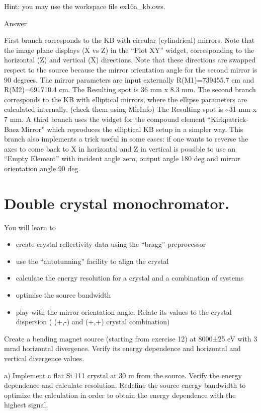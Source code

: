 \documentclass[]{article}
\providecommand{\tightlist}{%
  \setlength{\itemsep}{0pt}\setlength{\parskip}{0pt}}
\begin{document}
Hint: you may use the workspace file ex16a\_kb.ows.

Answer

First branch corresponds to the KB with circular (cylindrical) mirrors.
Note that the image plane displays (X vs Z) in the ``Plot XY'' widget,
corresponding to the horizontal (Z) and vertical (X) directions. Note
that these directions are swapped respect to the source because the
mirror orientation angle for the second mirror is 90 degrees. The mirror
parameters are input externally R(M1)=739455.7 cm and R(M2)=691710.4 cm.
The Resulting spot is 36 mm x 8.3 mm. The second branch corresponds to
the KB with elliptical mirrors, where the ellipse parameters are
calculated internally. (check them using MirInfo) The Resulting spot is
\textasciitilde{}31 mm x 7 mm. A third branch uses the widget for the
compound element ``Kirkpatrick-Baez Mirror'' which reproduces the
elliptical KB setup in a simpler way. This branch also implements a
trick useful in some cases: if one wants to reverse the axes to come
back to X in horizontal and Z in vertical is possible to use an ``Empty
Element'' with incident angle zero, output angle 180 deg and mirror
orientation angle 90 deg.

\section{Double crystal monochromator.
}\label{double-crystal-monochromator.}

You will learn to

\begin{itemize}
\tightlist
\item
  create crystal reflectivity data using the ``bragg'' preprocessor
\item
  use the ``autotunning'' facility to align the crystal
\item
  calculate the energy resolution for a crystal and a combination of
  systems
\item
  optimise the source bandwidth
\item
  play with the mirror orientation angle. Relate its values to the
  crystal dispersion ( (+,-) and (+,+) crystal combination)
\end{itemize}

Create a bending magnet source (starting from exercise 12) at 8000±25 eV
with 3 mrad horizontal divergence. Verify its energy dependence and
horizontal and vertical divergence values.

a) Implement a flat Si 111 crystal at 30 m from the source. Verify the
energy dependence and calculate resolution. Redefine the source energy
bandwidth to optimize the calculation in order to obtain the energy
dependence with the highest signal.
\end{document}
